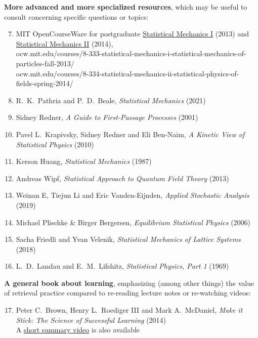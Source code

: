 \noindent\textbf{More advanced and more specialized resources}, which may be useful to consult concerning specific questions or topics: \\[-24 pt]
\begin{enumerate} %
  \setcounter{enumi}{6}
  \item MIT OpenCourseWare for postgraduate \href{https://ocw.mit.edu/courses/8-333-statistical-mechanics-i-statistical-mechanics-of-particles-fall-2013/}{Statistical Mechanics I} (2013) and \href{https://ocw.mit.edu/courses/8-334-statistical-mechanics-ii-statistical-physics-of-fields-spring-2014/}{Statistical Mechanics II} (2014), \\ ocw.mit.edu/courses/8-333-statistical-mechanics-i-statistical-mechanics-of- \\ particles-fall-2013/ \\ ocw.mit.edu/courses/8-334-statistical-mechanics-ii-statistical-physics-of- \\ fields-spring-2014/
  \item R.~K.~Pathria and P.~D.~Beale, \textit{Statistical Mechanics} (2021)
  \item Sidney Redner, \textit{A Guide to First-Passage Processes} (2001)
  \item Pavel L.~Krapivsky, Sidney Redner and Eli Ben-Naim, \textit{A Kinetic View of Statistical Physics} (2010)
  \item Kerson Huang, \textit{Statistical Mechanics} (1987)
  \item Andreas Wipf, \textit{Statistical Approach to Quantum Field Theory} (2013)
  \item Weinan E, Tiejun Li and Eric Vanden-Eijnden, \textit{Applied Stochastic Analysis} (2019)
  \item Michael Plischke \& Birger Bergersen, \textit{Equilibrium Statistical Physics} (2006)
  \item Sacha Friedli and Yvan Velenik, \textit{Statistical Mechanics of Lattice Systems} (2018)
  \item L.~D.~Landau and E.~M.~Lifshitz, \textit{Statistical Physics, Part 1} (1969)
\end{enumerate}

\newpage %
\noindent\textbf{A general book about learning}, emphasizing (among other things) the value of retrieval practice compared to re-reading lecture notes or re-watching videos: \\[-24 pt]
\begin{enumerate}
  \setcounter{enumi}{16}
  \item Peter C.~Brown, Henry L.~Roediger III and Mark A.~McDaniel, \textit{Make it Stick: The Science of Successful Learning} (2014) \\
        A \href{https://www.youtube.com/watch?v=MfylloWuuZU}{short summary video} is also available
\end{enumerate}

